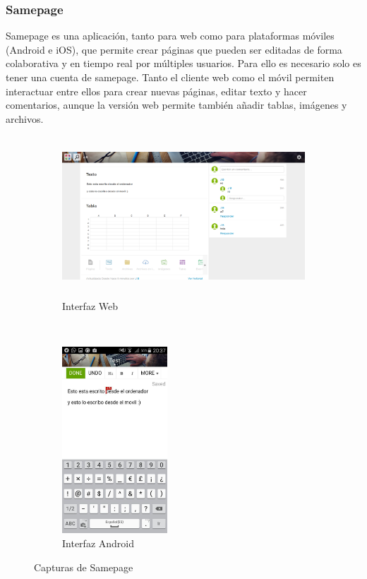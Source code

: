 	\subsubsection{Samepage}
	
	Samepage \cite{ref:samepage} es una aplicación, tanto para web como para plataformas móviles (Android e iOS), que permite crear páginas que pueden ser editadas de forma colaborativa y en tiempo real por múltiples usuarios. Para ello es necesario solo es tener una cuenta de samepage. Tanto el cliente web como el móvil permiten interactuar entre ellos para crear nuevas páginas, editar texto y hacer comentarios, aunque la versión web permite también añadir tablas, imágenes y archivos.
	
	\begin{figure}[H]
        \centering
        \begin{subfigure}[b]{0.6\textwidth}
                \includegraphics[width=\textwidth, height=6cm]{Media/Captures/samepageWeb.png}
                \caption{Interfaz Web}
                \label{fig:samepageWeb}
        \end{subfigure}
        ~
        \begin{subfigure}[b]{0.3\textwidth}
                \includegraphics[width=\textwidth, height=7cm]{Media/Captures/samepageApp.jpg}
                \caption{Interfaz Android}
                \label{fig:samepageApp}
        \end{subfigure}
        \caption{Capturas de Samepage}\label{fig:samepageCaptures}
	\end{figure}
	
